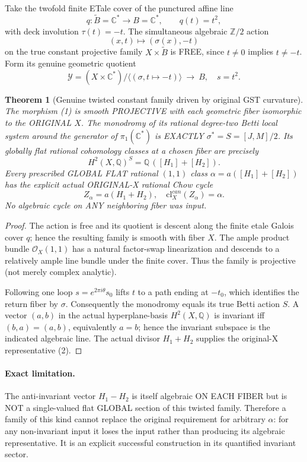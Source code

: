 \documentclass[11pt]{article}
\newtheorem{theorem}{Theorem}
\begin{document}
Take the twofold finite ETale cover of the
punctured affine line
\[
q:\widetilde B=\mathbb C^*\longrightarrow
B=\mathbb C^*,\qquad q(t)=t^2,
\]
with deck involution $\tau(t)=-t$.
The simultaneous algebraic $\mathbb Z/2$ action
\[
(x,t)\longmapsto(\sigma(x),-t)
\]
on the true constant projective family
$X\times\widetilde B$ is FREE, since
$t\ne0$ implies $t\ne-t$.
Form its genuine geometric quotient
\[
\boxed{
\mathcal Y=(X\times\mathbb C^*)/
\langle(\sigma,t\mapsto-t)\rangle
\ \longrightarrow\ B,\quad s=t^2 .
}
\tag{1}
\]

\begin{theorem}[Genuine twisted constant family driven by original GST curvature]
The morphism (1) is smooth PROJECTIVE with each geometric
fiber isomorphic to the ORIGINAL $X$. The monodromy
of its rational degree-two Betti local system around
the generator of $\pi_1(\mathbb C^*)$ is EXACTLY
$\sigma^*=S=[J,M]/2$.
Its globally flat rational cohomology classes at a chosen fiber
are precisely
\[
H^2(X,\mathbb Q)^S
=\mathbb Q\,([H_1]+[H_2]).
\]
Every prescribed GLOBAL FLAT rational $(1,1)$ class
$\alpha=a([H_1]+[H_2])$ has the explicit actual ORIGINAL-X
rational Chow cycle
\[
\boxed{Z_\alpha=a(H_1+H_2),\quad
\mathrm{cl}^{can}_X(Z_\alpha)=\alpha.}
\tag{2}
\]
No algebraic cycle on ANY neighboring fiber was input.
\end{theorem}

\begin{proof}
The action is free and its quotient is descent along
the finite etale Galois cover $q$; hence the
resulting family is smooth with fiber $X$.
The ample product bundle $\mathcal O_X(1,1)$
has a natural factor-swap linearization and descends
to a relatively ample line bundle under the finite cover.
Thus the family is projective (not merely complex analytic).

Following one loop $s=e^{2\pi i\theta}s_0$ lifts
$t$ to a path ending at $-t_0$, which identifies
the return fiber by $\sigma$. Consequently the
monodromy equals its true Betti action $S$.
A vector $(a,b)$ in the actual hyperplane-basis
$H^2(X,\mathbb Q)$ is invariant iff $(b,a)=(a,b)$,
equivalently $a=b$; hence the invariant subspace
is the indicated algebraic line.
The actual divisor $H_1+H_2$ supplies the
original-X representative (2).
\end{proof}

\paragraph{Exact limitation.}
The anti-invariant vector $H_1-H_2$ is itself
algebraic ON EACH FIBER but is NOT a single-valued
flat GLOBAL section of this twisted family.
Therefore a family of this kind cannot replace
the original requirement for arbitrary $\alpha$:
for any non-invariant input it loses the input
rather than producing its algebraic representative.
It is an explicit successful construction in its
quantified invariant sector.
\end{document}
